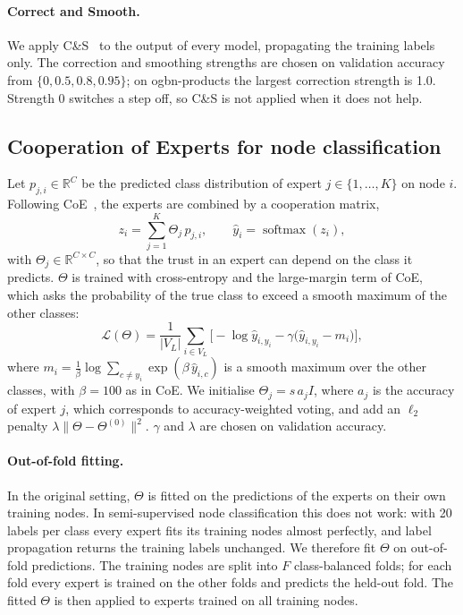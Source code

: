 \documentclass[sigconf,nonacm]{acmart}
\begin{document}
\paragraph{Correct and Smooth.}
We apply C\&S~\cite{huang2021cs} to the output of every model, propagating the training labels only.
The correction and smoothing strengths are chosen on validation accuracy from $\{0, 0.5, 0.8, 0.95\}$; on ogbn-products the largest correction strength is 1.0.
Strength 0 switches a step off, so C\&S is not applied when it does not help.

\subsection{Cooperation of Experts for node classification}

Let $p_{j,i}\in\mathbb{R}^C$ be the predicted class distribution of expert $j\in\{1,\dots,K\}$ on node $i$.
Following CoE~\cite{wang2025coe}, the experts are combined by a cooperation matrix,
\begin{equation}
z_i=\sum_{j=1}^{K}\Theta_j\,p_{j,i},\qquad \hat{y}_i=\operatorname{softmax}(z_i),
\end{equation}
with $\Theta_j\in\mathbb{R}^{C\times C}$, so that the trust in an expert can depend on the class it predicts.
$\Theta$ is trained with cross-entropy and the large-margin term of CoE, which asks the probability of the true class to exceed a smooth maximum of the other classes:
\begin{equation}
\mathcal{L}(\Theta)=\frac{1}{|V_L|}\sum_{i\in V_L}\Big[-\log \hat{y}_{i,y_i}-\gamma\big(\hat{y}_{i,y_i}-m_i\big)\Big],
\end{equation}
where $m_i=\frac{1}{\beta}\log\sum_{c\neq y_i}\exp(\beta\,\hat{y}_{i,c})$ is a smooth maximum over the other classes, with $\beta=100$ as in CoE.
We initialise $\Theta_j=s\,a_j I$, where $a_j$ is the accuracy of expert $j$, which corresponds to accuracy-weighted voting, and add an $\ell_2$ penalty $\lambda\|\Theta-\Theta^{(0)}\|^2$.
$\gamma$ and $\lambda$ are chosen on validation accuracy.

\paragraph{Out-of-fold fitting.}
In the original setting, $\Theta$ is fitted on the predictions of the experts on their own training nodes.
In semi-supervised node classification this does not work: with 20 labels per class every expert fits its training nodes almost perfectly, and label propagation returns the training labels unchanged.
We therefore fit $\Theta$ on out-of-fold predictions.
The training nodes are split into $F$ class-balanced folds; for each fold every expert is trained on the other folds and predicts the held-out fold.
The fitted $\Theta$ is then applied to experts trained on all training nodes.
\end{document}
